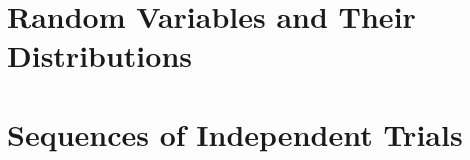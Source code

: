\documentclass{report}
\begin{document}

\chapter{Random Variables and Their Distributions}

\chapter{Sequences of Independent Trials}

\end{document}
